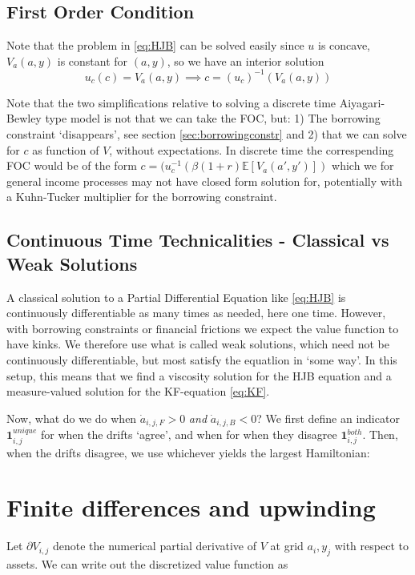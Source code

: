\documentclass[12pt]{article}
\newcommand{\E}{\mathbb{E}}
\DeclareMathOperator{\1}{\mathbbm{1}}
\begin{document}
\subsection{First Order Condition}
Note that the problem in \eqref{eq:HJB} can be solved easily since $u$ is concave, $V_a(a,y)$ is constant for $(a,y)$, so we have an interior solution
\begin{equation}
u_c(c)=V_a(a,y) \implies c=(u_c)^{-1} \left( V_a(a,y) \right )
\end{equation}

Note that the two simplifications relative to solving a discrete time Aiyagari-Bewley type model is not that we can take the FOC, but: 1) The borrowing constraint `disappears', see section \ref{sec:borrowingconstr} and 2) that we can solve for $c$ as function of $V$, without expectations. In discrete time the correspending FOC would be of the form $c=(u_c^{-1}\left(\beta(1+r)\E [V_a(a',y')]\right)$ which we for general income processes may not have closed form solution for, potentially with a Kuhn-Tucker multiplier for the borrowing constraint.

\subsection{Continuous Time Technicalities - Classical vs Weak Solutions}
\label{sec:contdetails}
A classical solution to a Partial Differential Equation like \ref{eq:HJB} is continuously differentiable as many times as needed, here one time. However, with borrowing constraints or financial frictions we expect the value function to have kinks. We therefore use what is called weak solutions, which need not be continuously differentiable, but most satisfy the equatlion in `some way'. In this setup, this means that we find a viscosity solution for the HJB equation and a measure-valued solution for the KF-equation \eqref{eq:KF}.

Now, what do we do when $\dot a_{i,j,F}>0$ \textit{and} $\dot a_{i,j,B}<0$? We first define an indicator $\mathbf{1}^{unique}_{i,j}$ for when the drifts `agree', and when for when they disagree $\mathbf{1}^{both}_{i,j}$. Then, when the drifts disagree, we use whichever yields the largest Hamiltonian:

\section{Finite differences and upwinding}
 Let $\partial V_{i,j}$ denote the numerical partial derivative of $V$ at grid $a_i,y_j$ with respect to assets. We can write out the discretized value function as 
\end{document}

